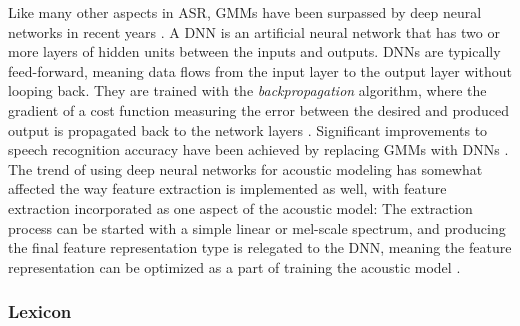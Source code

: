 \documentclass[english, 12pt, a4paper, pdftex, elec, utf8]{aaltothesis}
\begin{document}
Like many other aspects in ASR, GMMs have been surpassed by deep neural networks in recent years \cite{hinton2012deep}. A DNN is an artificial neural network that has two or more layers of hidden units between the inputs and outputs. DNNs are typically feed-forward, meaning data flows from the input layer to the output layer without looping back. They are trained with the \textit{backpropagation} algorithm, where the gradient of a cost function measuring the error between the desired and produced output is propagated back to the network layers \cite[p.~57--60]{yu2014automatic}. Significant improvements to speech recognition accuracy have been achieved by replacing GMMs with DNNs \cite{yu2014automatic, hinton2012deep, xiong2016achieving}. The trend of using deep neural networks for acoustic modeling has somewhat affected the way feature extraction is implemented as well, with feature extraction incorporated as one aspect of the acoustic model: The extraction process can be started with a simple linear or mel-scale spectrum, and producing the final feature representation type is relegated to the DNN, meaning the feature representation can be optimized as a part of training the acoustic model \cite{kallasjoki2016}.

\subsubsection{Lexicon}
\end{document}
